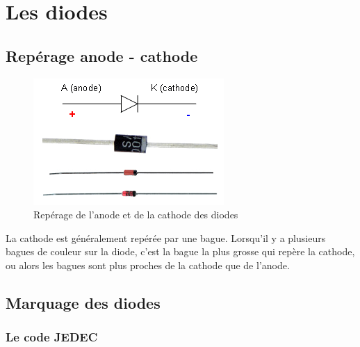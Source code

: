 \documentclass[a4paper]{article}
\begin{document}
\section{Les diodes}

\subsection{Repérage anode - cathode}

\begin{figure}[H]
	\centering
	\includegraphics[scale=0.75]{Images/Diodes_sens.png}
	\caption{Repérage de l'anode et de la cathode des diodes
		\label{Diodes_sens}}
\end{figure}

La cathode est généralement repérée par une bague. Lorsqu'il y a plusieurs bagues de couleur sur la diode, c'est la bague la plus grosse qui repère la cathode, ou alors les bagues sont plus proches de la cathode que de l'anode.

\subsection{Marquage des diodes}

\subsubsection{Le code JEDEC}
\end{document}
